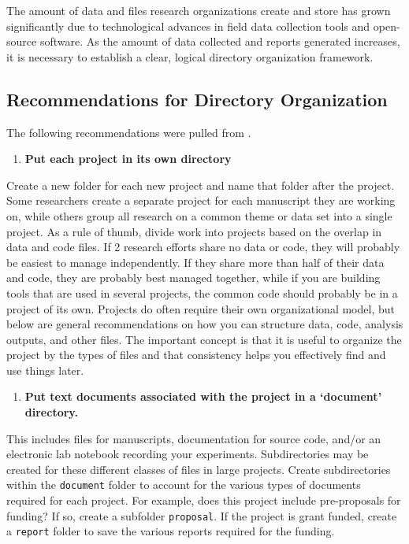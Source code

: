 \documentclass[
]{book}
\providecommand{\tightlist}{%
  \setlength{\itemsep}{0pt}\setlength{\parskip}{0pt}}
\begin{document}
The amount of data and files research organizations create and store has grown significantly due to technological advances in field data collection tools and open-source software. As the amount of data collected and reports generated increases, it is necessary to establish a clear, logical directory organization framework.

\hypertarget{recommendations-for-directory-organization}{%
\subsection{Recommendations for Directory Organization}\label{recommendations-for-directory-organization}}

The following recommendations were pulled from \citet{Spreckelsen_2020}.

\begin{enumerate}
\def\labelenumi{\arabic{enumi}.}
\tightlist
\item
  \textbf{Put each project in its own directory}
\end{enumerate}

Create a new folder for each new project and name that folder after the project. Some researchers create a separate project for each manuscript they are working on, while others group all research on a common theme or data set into a single project.
As a rule of thumb, divide work into projects based on the overlap in data and code files. If 2 research efforts share no data or code, they will probably be easiest to manage independently. If they share more than half of their data and code, they are probably best managed together, while if you are building tools that are used in several projects, the common code should probably be in a project of its own. Projects do often require their own organizational model, but below are general recommendations on how you can structure data, code, analysis outputs, and other files. The important concept is that it is useful to organize the project by the types of files and that consistency helps you effectively find and use things later.

\begin{enumerate}
\def\labelenumi{\arabic{enumi}.}
\setcounter{enumi}{1}
\tightlist
\item
  \textbf{Put text documents associated with the project in a `document' directory.}
\end{enumerate}

This includes files for manuscripts, documentation for source code, and/or an electronic lab notebook recording your experiments. Subdirectories may be created for these different classes of files in large projects. Create subdirectories within the \texttt{document} folder to account for the various types of documents required for each project. For example, does this project include pre-proposals for funding? If so, create a subfolder \texttt{proposal}. If the project is grant funded, create a \texttt{report} folder to save the various reports required for the funding.
\end{document}
